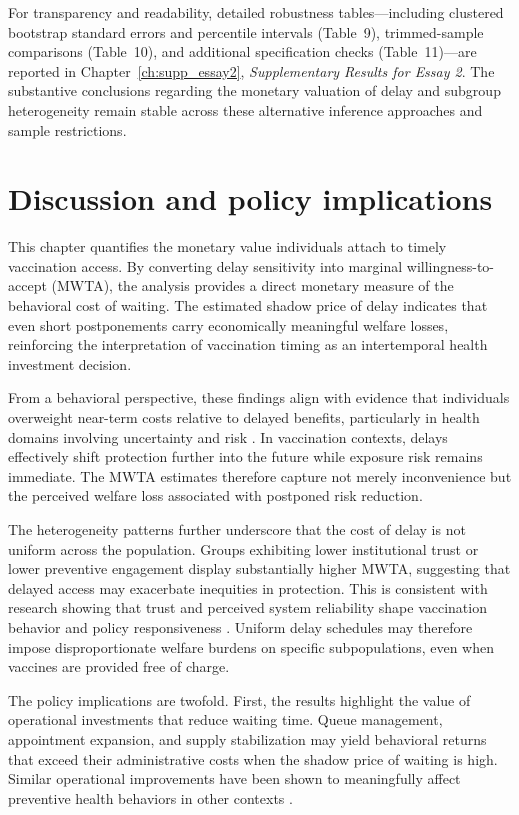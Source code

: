 \documentclass[doublespacing]{utdthesis}
\let\cite=\citep
\begin{document}
For transparency and readability, detailed robustness tables—including clustered bootstrap standard errors and percentile intervals (Table~9), trimmed-sample comparisons (Table~10), and additional specification checks (Table~11)—are reported in Chapter~\ref{ch:supp_essay2}, \emph{Supplementary Results for Essay 2}. The substantive conclusions regarding the monetary valuation of delay and subgroup heterogeneity remain stable across these alternative inference approaches and sample restrictions.

\clearpage

\section{Discussion and policy implications}
\label{sec:essay2_discussion}

This chapter quantifies the monetary value individuals attach to timely vaccination access. By converting delay sensitivity into marginal willingness-to-accept (MWTA), the analysis provides a direct monetary measure of the behavioral cost of waiting. The estimated shadow price of delay indicates that even short postponements carry economically meaningful welfare losses, reinforcing the interpretation of vaccination timing as an intertemporal health investment decision.

From a behavioral perspective, these findings align with evidence that individuals overweight near-term costs relative to delayed benefits, particularly in health domains involving uncertainty and risk \cite{Chapman2005,Frederick2002}. In vaccination contexts, delays effectively shift protection further into the future while exposure risk remains immediate. The MWTA estimates therefore capture not merely inconvenience but the perceived welfare loss associated with postponed risk reduction.

The heterogeneity patterns further underscore that the cost of delay is not uniform across the population. Groups exhibiting lower institutional trust or lower preventive engagement display substantially higher MWTA, suggesting that delayed access may exacerbate inequities in protection. This is consistent with research showing that trust and perceived system reliability shape vaccination behavior and policy responsiveness \cite{Betsch2018,Larson2018}. Uniform delay schedules may therefore impose disproportionate welfare burdens on specific subpopulations, even when vaccines are provided free of charge.

The policy implications are twofold. First, the results highlight the value of operational investments that reduce waiting time. Queue management, appointment expansion, and supply stabilization may yield behavioral returns that exceed their administrative costs when the shadow price of waiting is high. Similar operational improvements have been shown to meaningfully affect preventive health behaviors in other contexts \cite{Milkman2011,Volpp2008}. 
\end{document}
